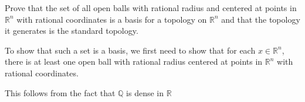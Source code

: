 \begin{qBox}{1}
    Prove that the set of all open balls with rational radius and centered at 
    points in \( \mathbb{R}^{ n } \) with rational coordinates is a basis for a 
    topology on \( \mathbb{R}^{ n } \) and that the topology it generates is the
    standard topology.

    \tcblower 

    To show that such a set is a basis, we first need to show that for each 
    \( x \in \mathbb{R}^{ n } \), there is at least one open ball with rational 
    radius centered at points in \( \mathbb{R}^{ n } \) with rational 
    coordinates.

    \baseSkip 

    This follows from the fact that \( \mathbb{Q} \) is dense in \( \mathbb{R} 
    \)
\end{qBox}

\baseRule